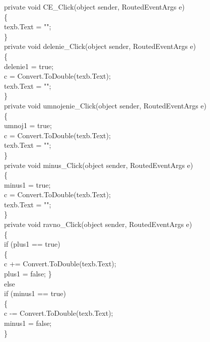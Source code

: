         private void CE\_Click(object sender, RoutedEventArgs e)\\
        \{\\
            texb.Text = "";\\
        \}\\

        private void delenie\_Click(object sender, RoutedEventArgs e)\\
        \{\\
            delenie1 = true;\\
            c = Convert.ToDouble(texb.Text);\\
            texb.Text = "";\\
        \}\\

        private void umnojenie\_Click(object sender, RoutedEventArgs e)\\
        \{\\
            umnoj1 = true;\\
            c = Convert.ToDouble(texb.Text);\\
            texb.Text = "";\\
        \}\\

        private void minus\_Click(object sender, RoutedEventArgs e)\\
        \{\\
            minus1 = true;\\
            c = Convert.ToDouble(texb.Text);\\
            texb.Text = "";\\
        \}\\

        private void ravno\_Click(object sender, RoutedEventArgs e)\\
        \{\\
            if (plus1 == true)\\
            \{\\
                c += Convert.ToDouble(texb.Text);\\
                plus1 = false;
            \}\\

            else\\
            if (minus1 == true)\\
            \{\\
                c -= Convert.ToDouble(texb.Text);\\
                minus1 = false;\\
            \}\\

